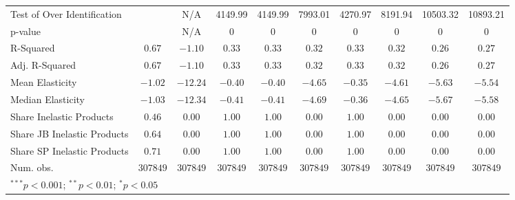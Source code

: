 \begin{tabular}{l c c c c c c c c c}
Test of Over Identification &               & N/A           & 4149.99       & 4149.99       & 7993.01       & 4270.97       & 8191.94       & 10503.32      & 10893.21      \\
p-value                     &               & N/A           & 0             & 0             & 0             & 0             & 0             & 0             & 0             \\
R-Squared                   & $0.67$        & $-1.10$       & $0.33$        & $0.33$        & $0.32$        & $0.33$        & $0.32$        & $0.26$        & $0.27$        \\
Adj. R-Squared              & $0.67$        & $-1.10$       & $0.33$        & $0.33$        & $0.32$        & $0.33$        & $0.32$        & $0.26$        & $0.27$        \\
Mean Elasticity             & $-1.02$       & $-12.24$      & $-0.40$       & $-0.40$       & $-4.65$       & $-0.35$       & $-4.61$       & $-5.63$       & $-5.54$       \\
Median Elasticity           & $-1.03$       & $-12.34$      & $-0.41$       & $-0.41$       & $-4.69$       & $-0.36$       & $-4.65$       & $-5.67$       & $-5.58$       \\
Share Inelastic Products    & $0.46$        & $0.00$        & $1.00$        & $1.00$        & $0.00$        & $1.00$        & $0.00$        & $0.00$        & $0.00$        \\
Share JB Inelastic Products & $0.64$        & $0.00$        & $1.00$        & $1.00$        & $0.00$        & $1.00$        & $0.00$        & $0.00$        & $0.00$        \\
Share SP Inelastic Products & $0.71$        & $0.00$        & $1.00$        & $1.00$        & $0.00$        & $1.00$        & $0.00$        & $0.00$        & $0.00$        \\
Num. obs.                   & $307849$      & $307849$      & $307849$      & $307849$      & $307849$      & $307849$      & $307849$      & $307849$      & $307849$      \\
\bottomrule
\multicolumn{10}{l}{\scriptsize{$^{***}p<0.001$; $^{**}p<0.01$; $^{*}p<0.05$}}
\end{tabular}
